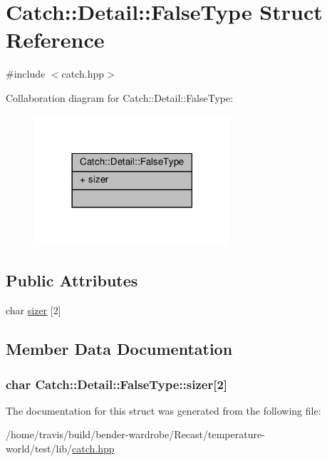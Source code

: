 \hypertarget{struct_catch_1_1_detail_1_1_false_type}{\section{Catch\-:\-:Detail\-:\-:False\-Type Struct Reference}
\label{struct_catch_1_1_detail_1_1_false_type}
}


{\ttfamily \#include $<$catch.\-hpp$>$}



Collaboration diagram for Catch\-:\-:Detail\-:\-:False\-Type\-:
\nopagebreak
\begin{figure}[H]
\begin{center}
\leavevmode
\includegraphics[width=206pt]{struct_catch_1_1_detail_1_1_false_type__coll__graph}
\end{center}
\end{figure}
\subsection*{Public Attributes}
\begin{DoxyCompactItemize}
\item 
char \hyperlink{struct_catch_1_1_detail_1_1_false_type_abc1a730e197d6f7750ae8aaf47b63477}{sizer} \mbox{[}2\mbox{]}
\end{DoxyCompactItemize}


\subsection{Member Data Documentation}
\hypertarget{struct_catch_1_1_detail_1_1_false_type_abc1a730e197d6f7750ae8aaf47b63477}{
\subsubsection[{sizer}]{\setlength{\rightskip}{0pt plus 5cm}char Catch\-::\-Detail\-::\-False\-Type\-::sizer\mbox{[}2\mbox{]}}}\label{struct_catch_1_1_detail_1_1_false_type_abc1a730e197d6f7750ae8aaf47b63477}


The documentation for this struct was generated from the following file\-:\begin{DoxyCompactItemize}
\item 
/home/travis/build/bender-\/wardrobe/\-Recast/temperature-\/world/test/lib/\hyperlink{catch_8hpp}{catch.\-hpp}\end{DoxyCompactItemize}
